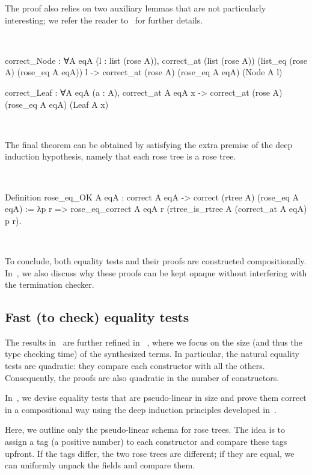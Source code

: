 \documentclass[a4paper, 11pt]{book}
\newenvironment{rocqcode}
  {\VerbatimEnvironment~\\\begin{rocqbox}\begin{xrocqcode}}{\end{xrocqcode}
\end{rocqbox}\\}
\begin{document}
\noindent
The proof also relies on two auxiliary lemmas that are not particularly
interesting; we refer the reader to~\cite{tassi:hal-01897468} for further
details.

\begin{rocqcode}
correct_Node : ∀A eqA (l : list (rose A)),
  correct_at (list (rose A)) (list_eq (rose A) (rose_eq A eqA)) l ->
    correct_at (rose A) (rose_eq A eqA) (Node A l)

correct_Leaf : ∀A eqA (a : A),
  correct_at A eqA x ->
    correct_at (rose A) (rose_eq A eqA) (Leaf A x)
\end{rocqcode}

The final theorem can be obtained by satisfying the extra premise of the deep
induction hypothesis, namely that each rose tree is a rose tree.

\begin{rocqcode}
Definition rose_eq_OK A eqA :
  correct A eqA -> correct (rtree A) (rose_eq A eqA)
:=
  λp r =>
    rose_eq_correct A eqA
      r (rtree_is_rtree A (correct_at A eqA) p r).
\end{rocqcode}


To conclude, both equality tests and their proofs are constructed
compositionally. In~\cite{tassi:hal-01897468}, we also discuss why these proofs
can be kept opaque without interfering with the termination checker.

\subsection{Fast (to check) equality tests}

The results in~\cite{tassi:hal-01897468} are further refined in
~\cite{gregoire:hal-03800154}, where we focus on the size (and thus the type
checking time) of the synthesized terms. In particular, the natural equality
tests are quadratic: they compare each constructor with all the others.
Consequently, the proofs are also quadratic in the number of constructors.

In~\cite{gregoire:hal-03800154}, we devise equality tests that are pseudo-linear
in size and prove them correct in a compositional way using the deep induction
principles developed in~\cite{tassi:hal-01897468}.

Here, we outline only the pseudo-linear schema for rose trees. The idea is to
assign a tag (a positive number) to each constructor and compare these tags
upfront. If the tags differ, the two rose trees are different; if they are
equal, we can uniformly unpack the fields and compare them.
\end{document}
